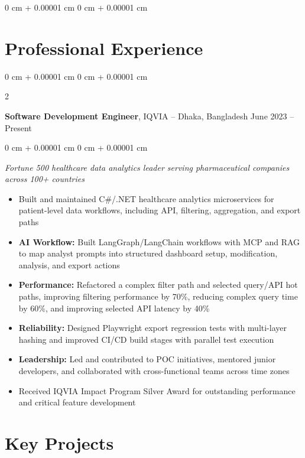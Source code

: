 \documentclass[10pt, letterpaper]{article}
\newenvironment{highlights}{
    \begin{itemize}[
        topsep=0.05 cm,
        parsep=0.05 cm,
        partopsep=0pt,
        itemsep=0pt,
        leftmargin=0 cm + 10pt
    ]
}{
    \end{itemize}
} %
\newenvironment{onecolentry}{
    \begin{adjustwidth}{
        0 cm + 0.00001 cm
    }{
        0 cm + 0.00001 cm
    }
}{
    \end{adjustwidth}
} %
\newenvironment{twocolentry}[2][]{
    \onecolentry
    \def\secondColumn{#2}
    \setcolumnwidth{\fill, 4.5 cm}
    \begin{paracol}{2}
}{
    \switchcolumn \raggedleft \secondColumn
    \end{paracol}
    \endonecolentry
} %
\newenvironment{header}{
    \setlength{\topsep}{0pt}\par\kern\topsep\centering\linespread{0.95}
}{
    \par\kern\topsep
} %
\begin{document}
\begin{header}
\begin{onecolentry}
    \section{Professional Experience}
        
        \begin{twocolentry}{
            June 2023 – Present
        }
            \textbf{Software Development Engineer}, IQVIA -- Dhaka, Bangladesh\end{twocolentry}
        \begin{onecolentry}
            \textit{Fortune 500 healthcare data analytics leader serving pharmaceutical companies across 100+ countries}
            \begin{highlights}
                \item Built and maintained C\#/.NET healthcare analytics microservices for patient-level data workflows, including API, filtering, aggregation, and export paths
                \item \textbf{AI Workflow:} Built LangGraph/LangChain workflows with MCP and RAG to map analyst prompts into structured dashboard setup, modification, analysis, and export actions
                \item \textbf{Performance:} Refactored a complex filter path and selected query/API hot paths, improving filtering performance by 70\%, reducing complex query time by 60\%, and improving selected API latency by 40\%
                \item \textbf{Reliability:} Designed Playwright export regression tests with multi-layer hashing and improved CI/CD build stages with parallel test execution
                \item \textbf{Leadership:} Led and contributed to POC initiatives, mentored junior developers, and collaborated with cross-functional teams across time zones
                \item Received IQVIA Impact Program Silver Award for outstanding performance and critical feature development
            \end{highlights}
        \end{onecolentry}

    \section{Key Projects}


\end{onecolentry}
\end{header}
\end{document}
